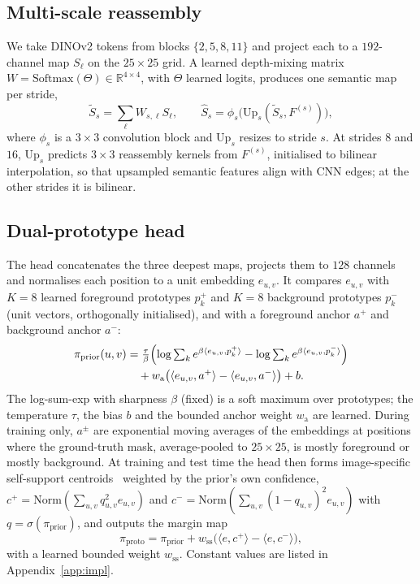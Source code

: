 \documentclass[10pt,twocolumn]{article}
\begin{document}
\subsection{Multi-scale reassembly}
We take DINOv2 tokens from blocks $\{2,5,8,11\}$ and project each to a $192$-channel map $S_\ell$ on the $25\times25$ grid. A learned depth-mixing matrix $W=\mathrm{Softmax}(\Theta)\in\mathbb{R}^{4\times4}$, with $\Theta$ learned logits, produces one semantic map per stride,
\begin{equation}
  \tilde S_s=\sum_{\ell} W_{s,\ell}S_\ell,\qquad \hat S_s=\phi_s\bigl(\mathrm{Up}_s(\tilde S_s,F^{(s)})\bigr),
  \label{eq:dpt}
\end{equation}
where $\phi_s$ is a $3\times3$ convolution block and $\mathrm{Up}_s$ resizes to stride $s$. At strides $8$ and $16$, $\mathrm{Up}_s$ predicts $3\times3$ reassembly kernels from $F^{(s)}$, initialised to bilinear interpolation, so that upsampled semantic features align with CNN edges; at the other strides it is bilinear.

\subsection{Dual-prototype head}
The head concatenates the three deepest maps, projects them to $128$ channels and normalises each position to a unit embedding $e_{u,v}$. It compares $e_{u,v}$ with $K=8$ learned foreground prototypes $p_k^+$ and $K=8$ background prototypes $p_k^-$ (unit vectors, orthogonally initialised), and with a foreground anchor $a^+$ and background anchor $a^-$:
\begin{align}
  \pi_{\text{prior}}(u,v) &= \tfrac{\tau}{\beta}\Bigl(\log\textstyle\sum_k e^{\beta\langle e_{u,v},p_k^+\rangle}-\log\textstyle\sum_k e^{\beta\langle e_{u,v},p_k^-\rangle}\Bigr)\nonumber\\
  &\quad + w_{\text{a}}\bigl(\langle e_{u,v},a^+\rangle-\langle e_{u,v},a^-\rangle\bigr)+b.
  \label{eq:proto_prior}
\end{align}
The log-sum-exp with sharpness $\beta$ (fixed) is a soft maximum over prototypes; the temperature $\tau$, the bias $b$ and the bounded anchor weight $w_{\text{a}}$ are learned. During training only, $a^\pm$ are exponential moving averages of the embeddings at positions where the ground-truth mask, average-pooled to $25\times25$, is mostly foreground or mostly background. At training and test time the head then forms image-specific self-support centroids~\citep{fan2022ssp} weighted by the prior's own confidence, $c^+=\mathrm{Norm}(\sum_{u,v}q_{u,v}^2e_{u,v})$ and $c^-=\mathrm{Norm}(\sum_{u,v}(1-q_{u,v})^2e_{u,v})$ with $q=\sigma(\pi_{\text{prior}})$, and outputs the margin map
\begin{equation}
  \pi_{\text{proto}}=\pi_{\text{prior}}+w_{\text{ss}}\bigl(\langle e,c^+\rangle-\langle e,c^-\rangle\bigr),
  \label{eq:proto_total}
\end{equation}
with a learned bounded weight $w_{\text{ss}}$. Constant values are listed in Appendix~\ref{app:impl}.
\end{document}
